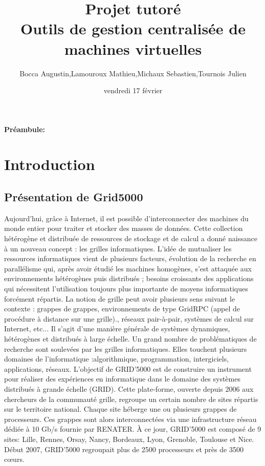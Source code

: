 \documentclass[a4paper,11pt]{report}
\title{\Huge \textbf{\fontfamily{phv}Projet tutoré \\
Outils de gestion centralisée de machines virtuelles}}
\author{Bocca Augustin,Lamouroux Mathieu,Michaux Sebastien,Tournois Julien}
\date{vendredi 17 février}
\begin{document}
\renewcommand{\chaptermark}[1]{\markboth{#1}{}} \renewcommand{\sectionmark}[1]{\markright{#1}}
\renewcommand{\headrulewidth}{0.25mm}
\renewcommand{\footrulewidth}{0.25mm}
\maketitle

\textbf{Préambule:}
\tableofcontents
  \chapter{Introduction}
    \section{Présentation de Grid5000}

Aujourd’hui, grâce à Internet, il est possible
d’interconnecter des machines du monde entier pour
traiter et stocker des masses de données. Cette collection
hétérogène et distribuée de ressources de stockage et de
calcul a donné naissance à un nouveau concept : les
grilles informatiques. L’idée de mutualiser les ressources
informatiques vient de plusieurs facteurs, évolution de la
recherche en parallélisme qui, après avoir étudié les
machines homogènes, s’est attaquée aux environnements
hétérogènes puis distribués ; besoins croissants des
applications qui nécessitent l’utilisation toujours plus
importante de moyens informatiques forcément répartis.
La notion de grille peut avoir plusieurs sens suivant le
contexte : grappes de grappes, environnements de type
GridRPC (appel de procédure à distance sur une grille).,
réseaux pair-à-pair, systèmes de calcul sur Internet, etc...
Il s’agit d’une manière générale de systèmes dynamiques,
hétérogènes et distribués à large échelle. Un grand
nombre de problématiques de recherche sont soulevées
par les grilles informatiques. Elles touchent plusieurs
domaines
de l’informatique :algorithmique,
programmation, intergiciels, applications, réseaux.
L’objectif de GRID’5000 est de construire un instrument
pour réaliser des expériences en informatique dans le
domaine des systèmes distribués à grande échelle (GRID).
Cette plate-forme, ouverte depuis 2006 aux chercheurs de
la communauté grille, regroupe un certain nombre de sites
répartis sur le territoire national. Chaque site héberge une
ou plusieurs grappes de processeurs. Ces grappes sont
alors interconnectées via une infrastructure réseau dédiée
à 10 Gb/s fournie par RENATER. À ce jour, GRID’5000
est composé de 9 sites: Lille, Rennes, Orsay, Nancy,
Bordeaux, Lyon, Grenoble, Toulouse et Nice. Début 2007,
GRID’5000 regroupait plus de 2500 processeurs et près
de 3500 cœurs.
\end{document}
